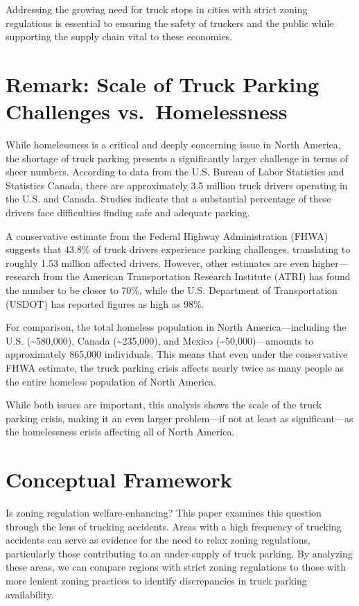 \documentclass[
  12pt]{article}
\begin{document}
Addressing the growing need for truck stops in cities with strict zoning
regulations is essential to ensuring the safety of truckers and the
public while supporting the supply chain vital to these economies.

\section{Remark: Scale of Truck Parking Challenges
vs.~Homelessness}\label{remark-scale-of-truck-parking-challenges-vs.-homelessness}

While homelessness is a critical and deeply concerning issue in North
America, the shortage of truck parking presents a significantly larger
challenge in terms of sheer numbers. According to data from the U.S.
Bureau of Labor Statistics and Statistics Canada, there are
approximately 3.5 million truck drivers operating in the U.S. and
Canada. Studies indicate that a substantial percentage of these drivers
face difficulties finding safe and adequate parking.

A conservative estimate from the Federal Highway Administration (FHWA)
suggests that 43.8\% of truck drivers experience parking challenges,
translating to roughly 1.53 million affected drivers. However, other
estimates are even higher---research from the American Transportation
Research Institute (ATRI) has found the number to be closer to 70\%,
while the U.S. Department of Transportation (USDOT) has reported figures
as high as 98\%.

For comparison, the total homeless population in North
America---including the U.S. (\textasciitilde580,000), Canada
(\textasciitilde235,000), and Mexico (\textasciitilde50,000)---amounts
to approximately 865,000 individuals. This means that even under the
conservative FHWA estimate, the truck parking crisis affects nearly
twice as many people as the entire homeless population of North America.

While both issues are important, this analysis shows the scale of the
truck parking crisis, making it an even larger problem---if not at least
as significant---as the homelessness crisis affecting all of North
America.

\section{Conceptual Framework}\label{conceptual-framework}

Is zoning regulation welfare-enhancing? This paper examines this
question through the lens of trucking accidents. Areas with a high
frequency of trucking accidents can serve as evidence for the need to
relax zoning regulations, particularly those contributing to an
under-supply of truck parking. By analyzing these areas, we can compare
regions with strict zoning regulations to those with more lenient zoning
practices to identify discrepancies in truck parking availability.
\end{document}
